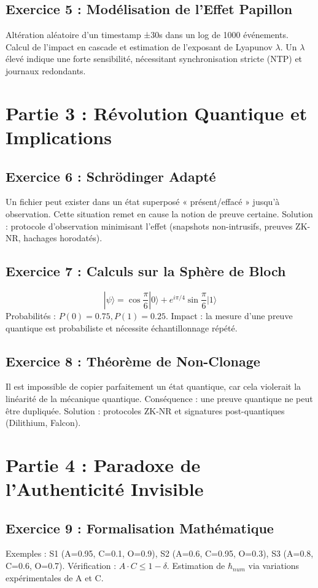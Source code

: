 \documentclass[12pt,a4paper]{article}
\begin{document}
\subsection*{Exercice 5 : Modélisation de l’Effet Papillon}
Altération aléatoire d’un timestamp ±30s dans un log de 1000 événements. Calcul de l’impact en cascade et estimation de l’exposant de Lyapunov \(\lambda\). Un \(\lambda\) élevé indique une forte sensibilité, nécessitant synchronisation stricte (NTP) et journaux redondants.

\section*{Partie 3 : Révolution Quantique et Implications}

\subsection*{Exercice 6 : Schrödinger Adapté}
Un fichier peut exister dans un état superposé « présent/effacé » jusqu’à observation. Cette situation remet en cause la notion de preuve certaine. Solution : protocole d’observation minimisant l’effet (snapshots non-intrusifs, preuves ZK-NR, hachages horodatés).

\subsection*{Exercice 7 : Calculs sur la Sphère de Bloch}
\[
|\psi\rangle = \cos\frac{\pi}{6}|0\rangle + e^{i\pi/4}\sin\frac{\pi}{6}|1\rangle
\]
Probabilités : \(P(0)=0.75, P(1)=0.25\). Impact : la mesure d’une preuve quantique est probabiliste et nécessite échantillonnage répété.

\subsection*{Exercice 8 : Théorème de Non-Clonage}
Il est impossible de copier parfaitement un état quantique, car cela violerait la linéarité de la mécanique quantique. Conséquence : une preuve quantique ne peut être dupliquée. Solution : protocoles ZK-NR et signatures post-quantiques (Dilithium, Falcon).

\section*{Partie 4 : Paradoxe de l’Authenticité Invisible}

\subsection*{Exercice 9 : Formalisation Mathématique}
Exemples : S1 (A=0.95, C=0.1, O=0.9), S2 (A=0.6, C=0.95, O=0.3), S3 (A=0.8, C=0.6, O=0.7). Vérification : \(A \cdot C \leq 1-\delta\). Estimation de \(\hbar_{num}\) via variations expérimentales de A et C.
\end{document}
